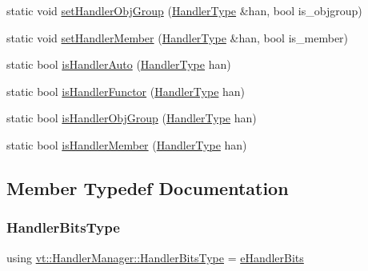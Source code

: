 \begin{DoxyCompactItemize}
static void \hyperlink{structvt_1_1_handler_manager_a0822ddaf90168e28fc9974e7f672b529}{set\+Handler\+Obj\+Group} (\hyperlink{namespacevt_af64846b57dfcaf104da3ef6967917573}{Handler\+Type} \&han, bool is\+\_\+objgroup)
\item 
static void \hyperlink{structvt_1_1_handler_manager_aca4acd8d7a769a2226931ae1febe6379}{set\+Handler\+Member} (\hyperlink{namespacevt_af64846b57dfcaf104da3ef6967917573}{Handler\+Type} \&han, bool is\+\_\+member)
\item 
static bool \hyperlink{structvt_1_1_handler_manager_a3324aeb71747bdd6b99194674dc03434}{is\+Handler\+Auto} (\hyperlink{namespacevt_af64846b57dfcaf104da3ef6967917573}{Handler\+Type} han)
\item 
static bool \hyperlink{structvt_1_1_handler_manager_a0d03f576b15390773522317a4086e725}{is\+Handler\+Functor} (\hyperlink{namespacevt_af64846b57dfcaf104da3ef6967917573}{Handler\+Type} han)
\item 
static bool \hyperlink{structvt_1_1_handler_manager_a41bb9a71156fa3010988e8b576022bf5}{is\+Handler\+Obj\+Group} (\hyperlink{namespacevt_af64846b57dfcaf104da3ef6967917573}{Handler\+Type} han)
\item 
static bool \hyperlink{structvt_1_1_handler_manager_a693afb1f820721217771ff0b9bcd71ae}{is\+Handler\+Member} (\hyperlink{namespacevt_af64846b57dfcaf104da3ef6967917573}{Handler\+Type} han)
\end{DoxyCompactItemize}


\subsection{Member Typedef Documentation}
\mbox{\label{structvt_1_1_handler_manager_ac2c93e168ab703b2441e0c38aa28a08f}} 
\subsubsection{\texorpdfstring{Handler\+Bits\+Type}{HandlerBitsType}}
{\footnotesize\ttfamily using \hyperlink{namespacevt_af182285b57b225b163d5d8aff03cb8c2}{vt\+::\+Handler\+Manager\+::\+Handler\+Bits\+Type} =  \hyperlink{namespacevt_af182285b57b225b163d5d8aff03cb8c2}{e\+Handler\+Bits}}



